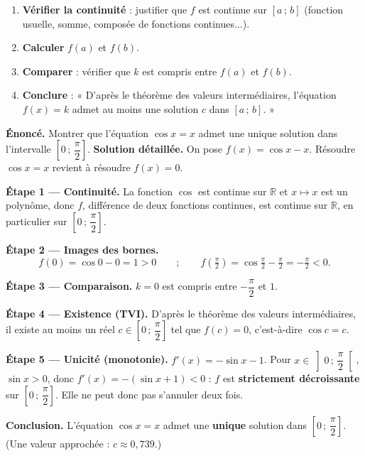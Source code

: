 \documentclass[11pt]{article}
\begin{document}
\begin{methode}[{Montrer qu'une équation $f(x) = k$ admet une solution sur $[a\,;\,b]$}]
\begin{enumerate}
\item \textbf{Vérifier la continuité} : justifier que $f$ est continue sur $[a\,;\,b]$ (fonction usuelle, somme, composée de fonctions continues...).
\item \textbf{Calculer} $f(a)$ et $f(b)$.
\item \textbf{Comparer} : vérifier que $k$ est compris entre $f(a)$ et $f(b)$.
\item \textbf{Conclure} : « D'après le théorème des valeurs intermédiaires, l'équation $f(x) = k$ admet au moins une solution $c$ dans $[a\,;\,b]$. »
\end{enumerate}
\end{methode}

\begin{exoresolu}[{L'équation $\cos x = x$ admet une solution unique dans $\left[0\,;\,\dfrac{\pi}{2}\right]$}]
\textbf{Énoncé.} Montrer que l'équation $\cos x = x$ admet une unique solution dans l'intervalle $\left[0\,;\,\dfrac{\pi}{2}\right]$.
\tcblower
\textbf{Solution détaillée.} On pose $f(x) = \cos x - x$. Résoudre $\cos x = x$ revient à résoudre $f(x) = 0$.

\textbf{Étape 1 — Continuité.} La fonction $\cos$ est continue sur $\mathbb{R}$ et $x \mapsto x$ est un polynôme, donc $f$, différence de deux fonctions continues, est continue sur $\mathbb{R}$, en particulier sur $\left[0\,;\,\dfrac{\pi}{2}\right]$.

\textbf{Étape 2 — Images des bornes.}
\[ f(0) = \cos 0 - 0 = 1 > 0 \qquad ; \qquad f\left(\tfrac{\pi}{2}\right) = \cos\tfrac{\pi}{2} - \tfrac{\pi}{2} = -\tfrac{\pi}{2} < 0. \]

\textbf{Étape 3 — Comparaison.} $k = 0$ est compris entre $-\dfrac{\pi}{2}$ et $1$.

\textbf{Étape 4 — Existence (TVI).} D'après le théorème des valeurs intermédiaires, il existe au moins un réel $c \in \left[0\,;\,\dfrac{\pi}{2}\right]$ tel que $f(c) = 0$, c'est-à-dire $\cos c = c$.

\textbf{Étape 5 — Unicité (monotonie).} $f'(x) = -\sin x - 1$. Pour $x \in \left]0\,;\,\dfrac{\pi}{2}\right[$, $\sin x > 0$, donc $f'(x) = -(\sin x + 1) < 0$ : $f$ est \textbf{strictement décroissante} sur $\left[0\,;\,\dfrac{\pi}{2}\right]$. Elle ne peut donc pas s'annuler deux fois.

\textbf{Conclusion.} L'équation $\cos x = x$ admet une \textbf{unique} solution dans $\left[0\,;\,\dfrac{\pi}{2}\right]$. (Une valeur approchée : $c \approx 0{,}739$.)
\end{exoresolu}
\end{document}
